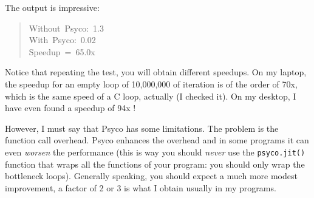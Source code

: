 \documentclass[10pt,english]{article}
\begin{document}
The output is impressive:
\begin{quote}
\begin{ttfamily}\begin{flushleft}
\mbox{Without~Psyco:~1.3}\\
\mbox{With~Psyco:~0.02}\\
\mbox{Speedup~=~65.0x}
\end{flushleft}\end{ttfamily}
\end{quote}

Notice that repeating the test, you will obtain different speedups.
On my laptop, the speedup for an empty loop of 10,000,000 of
iteration is of the order of 70x, which is the same speed of a C loop, 
actually (I checked it). On my desktop, I have even found a speedup of
94x !

However, I must say that Psyco has some limitations. The problem is
the function call overhead. Psyco enhances the overhead and in some
programs it can even \emph{worsen} the performance (this is way you should
\emph{never} use the \texttt{psyco.jit()} function that wraps all the functions of
your program: you should only wrap the bottleneck loops). Generally speaking, 
you should expect a much more modest improvement, a factor of 2 or 3
is what I obtain usually in my programs.
\end{document}
